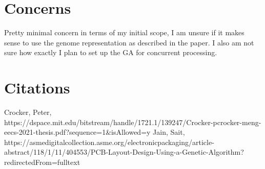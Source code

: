 \documentclass{article}
\begin{document}
\section{Concerns}
Pretty minimal concern in terms of my initial scope, I am unsure if it makes sense to use the genome representation as described in the paper. I also am not sure how exactly I plan to set up the GA for concurrent processing. 
\pagebreak
\section{Citations}

Crocker, Peter, https://dspace.mit.edu/bitstream/handle/1721.1/139247/Crocker-pcrocker-meng-eecs-2021-thesis.pdf?sequence=1&isAllowed=y 
Jain, Sait, https://asmedigitalcollection.asme.org/electronicpackaging/article-abstract/118/1/11/404553/PCB-Layout-Design-Using-a-Genetic-Algorithm?redirectedFrom=fulltext
\end{document}
